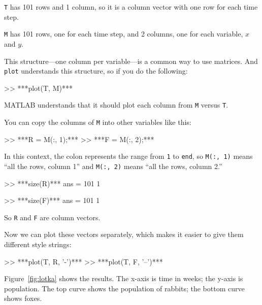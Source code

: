 \lstinline{T} has 101 rows and 1 column, so it is a column vector with one row for
each time step.

\lstinline{M} has 101 rows, one for each time step, and 2 columns, one for each variable,
$x$ and $y$.

This structure---one column per variable---is a common way to
use matrices. And \lstinline{plot} understands this structure, so if you
do the following:

\begin{code}
>> ***plot(T, M)***
\end{code}
MATLAB understands that it should plot each column from \lstinline{M}
versus \lstinline{T}.


You can copy the columns of \lstinline{M} into other variables like
this:

\begin{code}
>> ***R = M(:, 1);***
>> ***F = M(:, 2);***
\end{code}

In this context, the colon represents the range from \lstinline{1} to \lstinline{end},
so \lstinline{M(:, 1)} means ``all the rows, column 1'' and
\lstinline{M(:, 2)} means ``all the rows, column 2.''

\begin{code}
>> ***size(R)***
ans = 101     1

>> ***size(F)***
ans = 101     1
\end{code}

So \lstinline{R} and \lstinline{F} are column vectors.


Now we can plot these vectors separately, which makes it easier to give them different style strings:

\begin{code}
>> ***plot(T, R, '-')***
>> ***plot(T, F, '--')***
\end{code}


Figure~\ref{fig:lotka} shows the results. The x-axis is time in weeks; the y-axis is population.  The top curve shows the population of rabbits; the bottom curve shows foxes.


